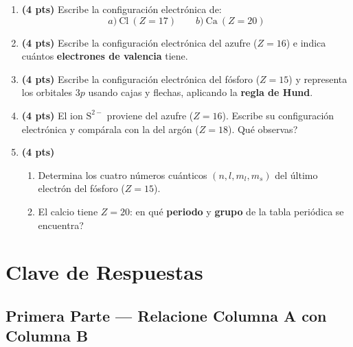 \documentclass[12pt, letterpaper]{article}
\begin{document}
\begin{enumerate}[leftmargin=*]
  \item \textbf{(4 pts)} Escribe la configuración electrónica de:
        \[
          a)\ \text{Cl} \ (Z = 17) \qquad b)\ \text{Ca} \ (Z = 20)
        \]

  \item \textbf{(4 pts)} Escribe la configuración electrónica del azufre ($Z = 16$) e indica cuántos \textbf{electrones de valencia} tiene.

  \item \textbf{(4 pts)} Escribe la configuración electrónica del fósforo ($Z = 15$) y representa los orbitales $3p$ usando cajas y flechas, aplicando la \textbf{regla de Hund}.

  \item \textbf{(4 pts)} El ion $\text{S}^{2-}$ proviene del azufre ($Z = 16$). Escribe su configuración electrónica y compárala con la del argón ($Z = 18$). \textquestiondown Qué observas?

  \item \textbf{(4 pts)}
        \begin{enumerate}[label=\alph*)]
          \item Determina los cuatro números cuánticos $(n, l, m_l, m_s)$ del último electrón del fósforo ($Z = 15$).
          \item El calcio tiene $Z = 20$: \textquestiondown en qué \textbf{periodo} y \textbf{grupo} de la tabla periódica se encuentra?
        \end{enumerate}
\end{enumerate}

\newpage

\ifmwclaves
  \section{Clave de Respuestas}

  \subsection*{Primera Parte — Relacione Columna A con Columna B}
\end{document}
